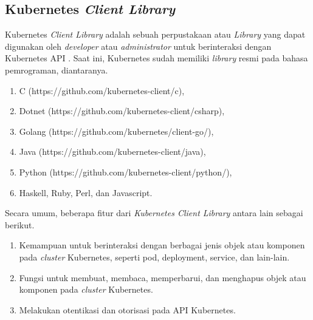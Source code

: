 \subsection{Kubernetes \textit{Client Library}}
Kubernetes \textit{Client Library} adalah sebuah perpustakaan atau \textit{Library} yang dapat digunakan oleh \textit{developer} atau \textit{administrator} untuk berinteraksi dengan Kubernetes API \parencite{clientlibrary}. Saat ini, Kubernetes sudah memiliki \textit{library} resmi pada bahasa pemrograman, diantaranya.

\begin{enumerate}
    \item C (https://github.com/kubernetes-client/c),
    \item Dotnet (https://github.com/kubernetes-client/csharp),
    \item Golang (https://github.com/kubernetes/client-go/),
    \item Java (https://github.com/kubernetes-client/java),
    \item Python (https://github.com/kubernetes-client/python/),
    \item Haskell, Ruby, Perl, dan Javascript.
\end{enumerate}

Secara umum, beberapa fitur dari \textit{Kubernetes Client Library} antara lain sebagai berikut.
\begin{enumerate}
    \item Kemampuan untuk berinteraksi dengan berbagai jenis objek atau komponen pada \textit{cluster} Kubernetes, seperti pod, deployment, service, dan lain-lain.
    \item Fungsi untuk membuat, membaca, memperbarui, dan menghapus objek atau komponen pada \textit{cluster} Kubernetes.
    \item Melakukan otentikasi dan otorisasi pada API Kubernetes.
\end{enumerate}